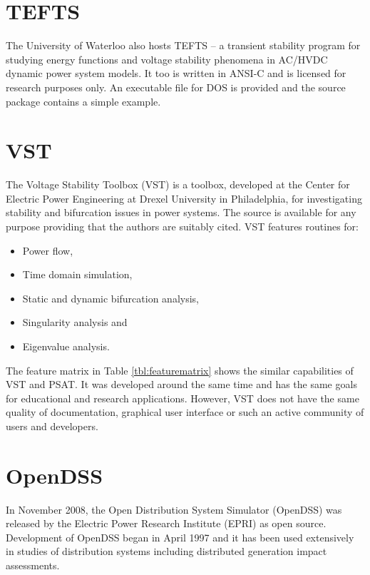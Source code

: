 \section{TEFTS}
The University of Waterloo also hosts TEFTS -- a transient stability program
for studying energy functions and voltage stability phenomena in AC/HVDC
dynamic power system models.  It too is written in ANSI-C and is licensed for
research purposes only.  An executable file for DOS is provided and the source
package contains a simple example.

\section{VST}
The Voltage Stability Toolbox (VST) is a \matlab toolbox, developed at the
Center for Electric Power Engineering at Drexel University in Philadelphia, for
investigating stability and bifurcation issues in power systems.  The source
is available for any purpose providing that the authors are suitably cited.
VST features routines for:
\begin{itemize}
  \item Power flow,
  \item Time domain simulation,
  \item Static and dynamic bifurcation analysis,
  \item Singularity analysis and
  \item Eigenvalue analysis.
\end{itemize}
The feature matrix in Table \ref{tbl:featurematrix} shows the similar
capabilities of VST and PSAT. It was developed around the same time and has
the same goals for educational and research applications.  However, VST does
not have the same quality of documentation, graphical user interface or such an
active community of users and developers.

\section{OpenDSS}
In November 2008, the Open Distribution System Simulator (OpenDSS) was released
by the Electric Power Research Institute (EPRI) as open source.  Development of
OpenDSS began in April 1997 and it has been used extensively in studies of
distribution systems including distributed generation impact assessments.

